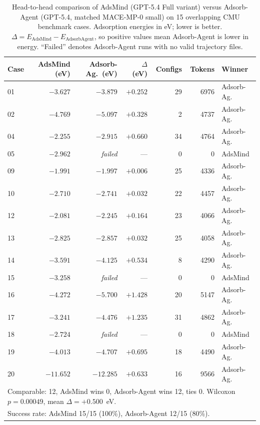 \documentclass[%
 preprint,
 superscriptaddress,
 amsmath,amssymb,
 aps,
 prb,
 floatfix,
]{revtex4-2}
\begin{document}
\begin{table}[ht]
\centering
\scriptsize
\caption{Head-to-head comparison of AdsMind (GPT-5.4 Full variant) versus Adsorb-Agent (GPT-5.4, matched MACE-MP-0 small) on 15 overlapping CMU benchmark cases. Adsorption energies in eV; lower is better. $\Delta = E_{\mathrm{AdsMind}} - E_{\mathrm{AdsorbAgent}}$, so positive values mean Adsorb-Agent is lower in energy. ``Failed'' denotes Adsorb-Agent runs with no valid trajectory files.}
\label{tab:si-adsorbagent-comparison}
\begin{tabular}{lrrrrrl}
\toprule
Case & AdsMind (eV) & Adsorb-Ag.\ (eV) & $\Delta$ (eV) & Configs & Tokens & Winner \\
\midrule
  01 & $-3.627$ & $-3.879$ & $+0.252$ & 29 & 6976 & Adsorb-Ag. \\
  02 & $-4.769$ & $-5.097$ & $+0.328$ & 2 & 4737 & Adsorb-Ag. \\
  04 & $-2.255$ & $-2.915$ & $+0.660$ & 34 & 4764 & Adsorb-Ag. \\
  05 & $-2.962$ & \textit{failed} & --- & 0 & 0 & AdsMind \\
  09 & $-1.991$ & $-1.997$ & $+0.006$ & 25 & 4336 & Adsorb-Ag. \\
  10 & $-2.710$ & $-2.741$ & $+0.032$ & 22 & 4457 & Adsorb-Ag. \\
  12 & $-2.081$ & $-2.245$ & $+0.164$ & 23 & 4066 & Adsorb-Ag. \\
  13 & $-2.825$ & $-2.857$ & $+0.032$ & 25 & 4058 & Adsorb-Ag. \\
  14 & $-3.591$ & $-4.125$ & $+0.534$ & 8 & 4290 & Adsorb-Ag. \\
  15 & $-3.258$ & \textit{failed} & --- & 0 & 0 & AdsMind \\
  16 & $-4.272$ & $-5.700$ & $+1.428$ & 20 & 5147 & Adsorb-Ag. \\
  17 & $-3.241$ & $-4.476$ & $+1.235$ & 31 & 4862 & Adsorb-Ag. \\
  18 & $-2.724$ & \textit{failed} & --- & 0 & 0 & AdsMind \\
  19 & $-4.013$ & $-4.707$ & $+0.695$ & 18 & 4490 & Adsorb-Ag. \\
  20 & $-11.652$ & $-12.285$ & $+0.633$ & 16 & 9566 & Adsorb-Ag. \\
\midrule
  \multicolumn{7}{l}{Comparable: 12, AdsMind wins 0, Adsorb-Agent wins 12, ties 0. Wilcoxon $p = 0.00049$, mean $\Delta = +0.500$~eV.} \\
  \multicolumn{7}{l}{Success rate: AdsMind 15/15 (100\%), Adsorb-Agent 12/15 (80\%).} \\
\bottomrule
\end{tabular}
\end{table}
\end{document}
